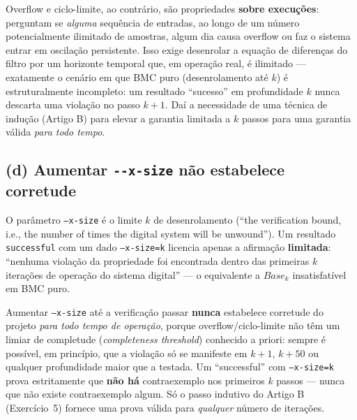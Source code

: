 \documentclass[12pt,a4paper]{article}
\newcommand{\vv}[1]{\texttt{#1}}
\begin{document}
\begin{tcolorbox}[notabox]
Overflow e ciclo-limite, ao contr\'ario, s\~ao propriedades \textbf{sobre execu\c{c}\~oes}:
perguntam se \emph{alguma} sequ\^encia de entradas, ao longo de um n\'umero potencialmente
ilimitado de amostras, algum dia causa overflow ou faz o sistema entrar em oscila\c{c}\~ao
persistente. Isso exige desenrolar a equa\c{c}\~ao de diferen\c{c}as do filtro por um
horizonte temporal que, em opera\c{c}\~ao real, \'e ilimitado --- exatamente o cen\'ario em
que BMC puro (desenrolamento at\'e $k$) \'e estruturalmente incompleto: um resultado
``sucesso'' em profundidade $k$ nunca descarta uma viola\c{c}\~ao no passo $k+1$. Da\'i a
necessidade de uma t\'ecnica de indu\c{c}\~ao (Artigo B) para elevar a garantia limitada a
$k$ passos para uma garantia v\'alida \emph{para todo tempo}.
\end{tcolorbox}

\subsection{(d) Aumentar \texttt{-{}-x-size} não estabelece corretude}

O par\^ametro \vv{--x-size} \'e o limite $k$ de desenrolamento (``the verification bound, i.e.,
the number of times the digital system will be unwound''). Um resultado \vv{successful} com
um dado \vv{--x-size=k} licencia apenas a afirma\c{c}\~ao \textbf{limitada}: ``nenhuma
viola\c{c}\~ao da propriedade foi encontrada dentro das primeiras $k$ itera\c{c}\~oes de
opera\c{c}\~ao do sistema digital'' --- o equivalente a $Base_k$ insatisfat\'ivel em BMC puro.

\begin{tcolorbox}[resultbox]
Aumentar \vv{--x-size} at\'e a verifica\c{c}\~ao passar \textbf{nunca} estabelece corretude do
projeto \emph{para todo tempo de opera\c{c}\~ao}, porque overflow/ciclo-limite n\~ao t\^em um
limiar de completude (\emph{completeness threshold}) conhecido a priori: sempre \'e poss\'ivel,
em princ\'ipio, que a viola\c{c}\~ao s\'o se manifeste em $k+1$, $k+50$ ou qualquer profundidade
maior que a testada. Um ``successful'' com \vv{--x-size=k} prova estritamente que \textbf{n\~ao
h\'a} contraexemplo nos primeiros $k$ passos --- nunca que n\~ao existe contraexemplo algum.
S\'o o passo indutivo do Artigo B (Exerc\'icio~5) fornece uma prova v\'alida para
\emph{qualquer} n\'umero de itera\c{c}\~oes.
\end{tcolorbox}

\newpage
\end{document}
